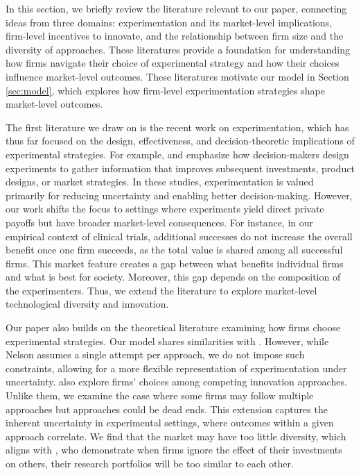 
In this section, we briefly review the literature relevant to our paper, connecting ideas from three domains: experimentation and its market-level implications, firm-level incentives to innovate, and the relationship between firm size and the diversity of approaches. These literatures provide a foundation for understanding how firms navigate their choice of experimental strategy and how their choices influence market-level outcomes. These literatures motivate our model in Section \ref{sec:model}, which explores how firm-level experimentation strategies shape market-level outcomes.

The first literature we draw on is the recent work on experimentation, which has thus far focused on the design, effectiveness, and decision-theoretic implications of experimental strategies. For example, \citet{koning2022experimentation} and \citet{gans2019foundations} emphasize how decision-makers design experiments to gather information that improves subsequent investments, product designs, or market strategies. In these studies, experimentation is valued primarily for reducing uncertainty and enabling better decision-making. However, our work shifts the focus to settings where experiments yield direct private payoffs but have broader market-level consequences. For instance, in our empirical context of clinical trials, additional successes do not increase the overall benefit once one firm succeeds, as the total value is shared among all successful firms. This market feature creates a gap between what benefits individual firms and what is best for society. Moreover, this gap depends on the composition of the experimenters. Thus, we extend the literature to explore market-level technological diversity and innovation.

Our paper also builds on the theoretical literature examining how firms choose experimental strategies. Our model shares similarities with \citet{nelson1961uncertainty}. However, while Nelson assumes a single attempt per approach, we do not impose such constraints, allowing for a more flexible representation of experimentation under uncertainty.  \citet{bryan2017direction} also explore firms’ choices among competing innovation approaches. Unlike them, we examine the case where some firms may follow multiple approaches but approaches could be dead ends. This extension captures the inherent uncertainty in experimental settings, where outcomes within a given approach correlate. We find that the market may have too little diversity, which aligns with \citet{dasgupta1987simple}, who demonstrate when firms ignore the effect of their investments on others, their research portfolios will be too similar to each other.

